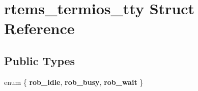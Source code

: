\hypertarget{structrtems__termios__tty}{}\section{rtems\+\_\+termios\+\_\+tty Struct Reference}
\label{structrtems__termios__tty}
\subsection*{Public Types}
\begin{DoxyCompactItemize}
\item 
\mbox{\label{structrtems__termios__tty_a78e29719acae399fc540bda49d7e2260}} 
enum \{ {\bfseries rob\+\_\+idle}, 
{\bfseries rob\+\_\+busy}, 
{\bfseries rob\+\_\+wait}
 \}
\end{DoxyCompactItemize}
